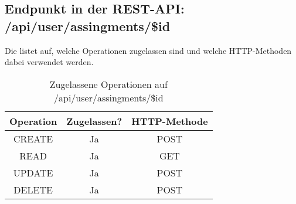 \subsection{Endpunkt in der REST-API: /api/user/assingments/\$id}
Die  listet auf, welche Operationen zugelassen sind und welche HTTP-Methoden dabei verwendet werden. 

\begin{table}[!htbp]
	\begin{tabular}{|c|c|c|}
		\hline
			\textbf{Operation} & \textbf{Zugelassen?} & \textbf{HTTP-Methode} \\ \hline
			CREATE & Ja & POST \\ \hline 
			READ & Ja & GET \\ \hline
			UPDATE & Ja & POST \\ \hline 
			DELETE & Ja & POST \\ \hline
	\end{tabular}

		\caption{Zugelassene Operationen auf /api/user/assingments/\$id}
		\label{tab:end:rest:api:user:assingments:id:meth}
\end{table}

